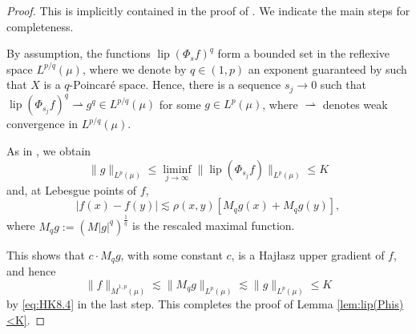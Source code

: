 \documentclass[11pt]{amsart}
\theoremstyle{definition}
\theoremstyle{remark}
\numberwithin{equation}{section}
\newcommand{\abs}[1]{|#1|}
\newcommand{\Norm}[2]{\|#1\|_{#2}}
\begin{document}
\begin{proof}
This is implicitly contained in the proof of \cite[Proposition 8.2]{HK:W1p}. We indicate the
main steps for completeness.

By assumption, the functions $\operatorname{lip}(\Phi_s f)^q$ form a bounded set in the
reflexive space $L^{p/q}(\mu)$, where we denote by $q\in(1,p)$ an exponent guaranteed by
\cite{KZ:08} such that $X$ is a $q$-Poincar\'e space. Hence, there is a sequence $s_j\to 0$
such that $\operatorname{lip}(\Phi_{s_j} f)^q\rightharpoonup g^q\in L^{p/q}(\mu)$ for some
$g\in L^p(\mu)$, where $\rightharpoonup$ denotes weak convergence in $L^{p/q}(\mu)$.

As in \cite[(8.4) and (8.5)]{HK:W1p}, we obtain
\begin{equation}\label{eq:HK8.4}
  \Norm{g}{L^p(\mu)}
  \leq\liminf_{j\to\infty}\Norm{\operatorname{lip}(\Phi_{s_j}f)}{L^p(\mu)} \leq K
\end{equation}
and, at Lebesgue points of $f$,
\begin{equation*}
  \abs{f(x)-f(y)}
  \lesssim\rho(x,y)\left[M_q g(x)+M_q g(y)\right],
\end{equation*}
where $M_q g:=(M\abs{g}^q)^{\frac1q}$ is the rescaled maximal function.

This shows that $c\cdot M_q g$, with some constant $c$, is a Haj\l{}asz upper gradient of
$f$, and hence
\begin{equation*}
  \Norm{f}{\dot M^{1,p}(\mu)}
  \lesssim\Norm{M_q g}{L^p(\mu)}
  \lesssim\Norm{g}{L^p(\mu)}
  \leq K
\end{equation*}
by \eqref{eq:HK8.4} in the last step.
This completes the proof of Lemma \ref{lem:lip(Phis)<K}.
\end{proof}
\end{document}
